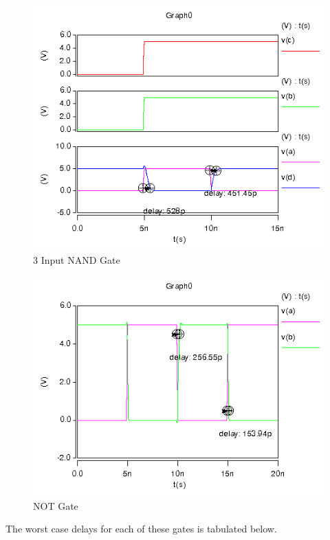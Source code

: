 \documentclass{article}
\begin{document}


\begin{figure}[H]
    \centering
    \includegraphics[width=0.75\linewidth]{../part_4/hspice/nand3_inv.png}
    \caption{3 Input NAND Gate}
\end{figure}



\begin{figure}[H]
    \centering
    \includegraphics[width=0.75\linewidth]{../part_4/hspice/not_inv.png}
    \caption{NOT Gate}
\end{figure}



\vspace{0.25in}
The worst case delays for each of these gates is tabulated below.
\end{document}

